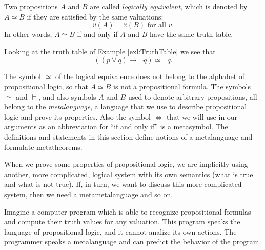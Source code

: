 \begin{page}
\setcounter{section}{1}
\setcounter{subsection}{3}
\setcounter{dfn}{7}
\label{portion:428}

\begin{dfn}
\label{dfn:LogEqProp}
Two propositions $A$ and $B$ are called \emph{logically equivalent}, which is denoted by $A \simeq B$ if they are satisfied by the same valuations:
\[
\hat{v}(A) = \hat{v}(B) \text{ for all }v.
\]
In other words, $A \simeq B$ if and only if $A$ and $B$ have the same truth table.
\end{dfn}

\end{page}

\begin{page}
\setcounter{section}{1}
\setcounter{subsection}{3}
\setcounter{dfn}{8}
\label{portion:431}

\begin{exl}
Looking at the truth table of Example \ref{exl:TruthTable} we see that
\[
((p \vee q) \to \neg q) \simeq \neg q.
\]
\end{exl}

\end{page}

\begin{page}
\setcounter{section}{1}
\setcounter{subsection}{3}
\setcounter{dfn}{9}
\label{portion:434}

\begin{rem}
The symbol $\simeq$ of the logical equivalence does not belong to the alphabet of propositional logic, so that $A \simeq B$ is not a propositional formula.
The symbols $\simeq$ and $\vDash$, and also symbols $A$ and $B$ used to denote arbitrary propositions,
all belong to the \emph{metalanguage}, a language that we use to describe propositional logic and prove its properties.
Also the symbol $\Leftrightarrow$ that we will use in our arguments as an abbreviation for ``if and only if'' is a metasymbol.
The definitions and statements in this section define notions of a metalanguage and formulate metatheorems.

When we prove some properties of propositional logic,
we are implicitly using another, more complicated, logical system with its own semantics (what is true and what is not true).
If, in turn, we want to discuss this more complicated system, then we need a metametalanguage and so on.

Imagine a computer program which is able to recognize propositional formulas and compute their truth values for any valuation.
This program speaks the language of propositional logic, and it cannot analize its own actions.
The programmer speaks a metalanguage and can predict the behavior of the program.
\end{rem}

\end{page}

